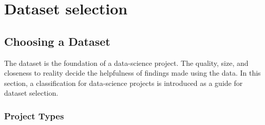 \chapter{Dataset selection}
\section{Choosing a Dataset}
	The dataset is the foundation of a data-science project. The quality, size, and closeness to reality decide the helpfulness of findings made using the data.
	In this section, a classification for data-science projects is introduced as a guide for dataset selection.
	
	\subsection{Project Types}
